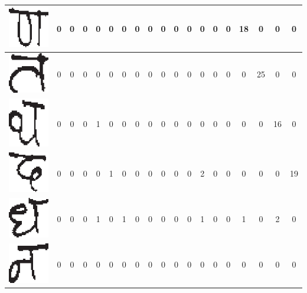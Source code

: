 \begin{table}[h]
\begin{tabular}{|c|c|c|c|c|c|c|c|c|c|c|c|c|c|c|c|c|c|c|}
\hline
\includegraphics[scale=0.25]{figures/datasets/nhcr/consonants/15yna} & 0 & 0 & 0 & 0 & 0 & 0 & 0 & 0 & 0 & 0 & 0 & 0 & 0 & 0 & 18 & 0 & 0 & 0\tabularnewline
\hline
\includegraphics[scale=0.25]{figures/datasets/nhcr/consonants/16ta} & 0 & 0 & 0 & 0 & 0 & 0 & 0 & 0 & 0 & 0 & 0 & 0 & 0 & 0 & 0 & 25 & 0 & 0\tabularnewline
\hline
\includegraphics[scale=0.25]{figures/datasets/nhcr/consonants/17tha} & 0 & 0 & 0 & 1 & 0 & 0 & 0 & 0 & 0 & 0 & 0 & 0 & 0 & 0 & 0 & 0 & 16 & 0\tabularnewline
\hline
\includegraphics[scale=0.25]{figures/datasets/nhcr/consonants/18da} & 0 & 0 & 0 & 0 & 1 & 0 & 0 & 0 & 0 & 0 & 0 & 2 & 0 & 0 & 0 & 0 & 0 & 19\tabularnewline
\hline
\includegraphics[scale=0.25]{figures/datasets/nhcr/consonants/19dha} & 0 & 0 & 0 & 1 & 0 & 1 & 0 & 0 & 0 & 0 & 0 & 1 & 0 & 0 & 1 & 0 & 2 & 0\tabularnewline
\hline
\includegraphics[scale=0.25]{figures/datasets/nhcr/consonants/20na} & 0 & 0 & 0 & 0 & 0 & 0 & 0 & 0 & 0 & 0 & 0 & 0 & 0 & 0 & 0 & 0 & 0 & 0\tabularnewline

\end{tabular}
\end{table}

